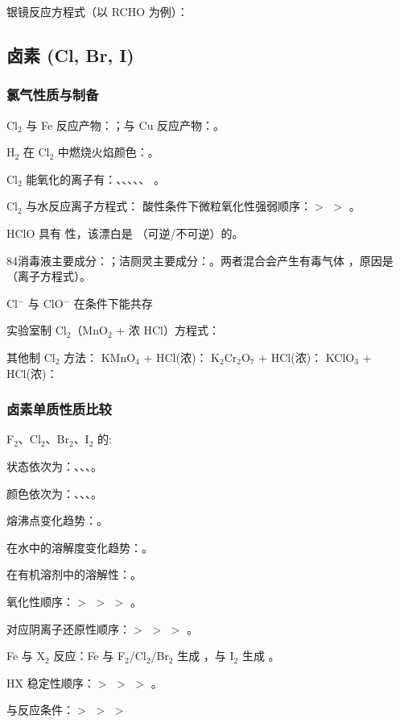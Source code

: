 银镜反应方程式（以 RCHO 为例）：

\subsection{卤素 (Cl, Br, I)}

\subsubsection{氯气性质与制备}
Cl$_2$ 与 Fe 反应产物：\sbl ；与 Cu 反应产物：\sbl 。

H$_2$ 在 Cl$_2$ 中燃烧火焰颜色：\sbl 。

Cl$_2$ 能氧化的离子有：\sbl 、\sbl 、\sbl 、\sbl 、\sbl 、 \sbl 。

Cl$_2$ 与水反应离子方程式：\lbl
酸性条件下微粒氧化性强弱顺序：\sbl $>$ \sbl $>$ \sbl 。

HClO 具有 \sbl 性，该漂白是 \sbl （可逆/不可逆）的。

84消毒液主要成分：\sbl ；洁厕灵主要成分：\sbl 。两者混合会产生有毒气体 \sbl ，原因是 \sbl （离子方程式）。

Cl$^-$ 与 ClO$^-$ 在\sbl 条件下能共存

实验室制 Cl$_2$（MnO$_2$ + 浓 HCl）方程式：\lbl


其他制 Cl$_2$ 方法：
KMnO$_4$ + HCl(浓)：\lbl
K$_2$Cr$_2$O$_7$ + HCl(浓)：\lbl
KClO$_3$ + HCl(浓)：\lbl

\subsubsection{卤素单质性质比较}
F$_2$、Cl$_2$、Br$_2$、I$_2$ 的:

状态依次为：\sbl 、\sbl 、\sbl 、\sbl 。

颜色依次为：\sbl 、\sbl 、\sbl 、\sbl 。

熔沸点变化趋势：\sbl 。

在水中的溶解度变化趋势：\sbl 。

在有机溶剂中的溶解性：\sbl 。

氧化性顺序：\sbl $>$ \sbl $>$ \sbl $>$ \sbl 。

对应阴离子还原性顺序：\sbl $>$ \sbl $>$ \sbl $>$ \sbl 。

Fe 与 X$_2$ 反应：Fe 与 F$_2$/Cl$_2$/Br$_2$ 生成 \sbl ，与 I$_2$ 生成 \sbl 。

HX 稳定性顺序：\sbl $>$ \sbl $>$ \sbl $>$ \sbl 。

与反应条件：\sbl $>$ \sbl $>$ \sbl $>$ \sbl 

